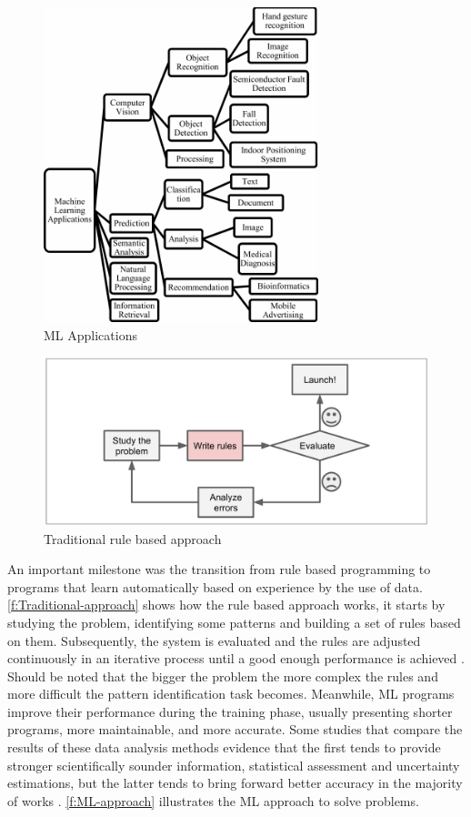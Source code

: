 \begin{figure}[t]
\centering
\includegraphics[width=8cm]{figures/Ch2/ML-Applications.png}
\caption{ML Applications \cite{Shinde_2018}}
\label{f:Ml-app}
\end{figure}

\begin{figure}[h]
\centering
\includegraphics[width=\linewidth]{figures/Ch2/Tradicional-Approach.png}
\caption{Traditional rule based approach \cite{geron2017}}
\label{f:Traditional-approach}
\end{figure}

An important milestone was the transition from rule based programming to programs that learn automatically based on experience by the use of data. \autoref{f:Traditional-approach} shows how the rule based approach works, it starts by studying the problem, identifying some patterns and building a set of rules based on them. Subsequently, the system is evaluated and the rules are adjusted continuously in an iterative process until a good enough performance is achieved \cite{geron2017}. Should be noted that the bigger the problem the more complex the rules and more difficult the pattern identification task becomes. Meanwhile, \ac{ML} programs improve their performance during the training phase, usually presenting shorter programs, more maintainable, and more accurate. Some studies that compare the results of these data analysis methods evidence that the first tends to provide stronger scientifically sounder information, statistical assessment and uncertainty estimations, but the latter tends to bring forward better accuracy in the majority of works \cite{geron2017,Ye2020}. \autoref{f:ML-approach} illustrates the \ac{ML} approach to solve problems.

